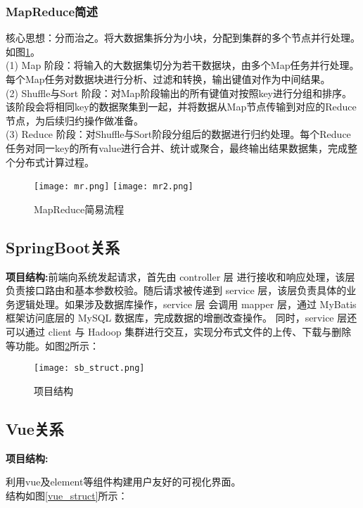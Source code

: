 \documentclass[bachelor]{thesis-uestc}
\begin{document}
\subsubsection{MapReduce简述}
核心思想：分而治之。将大数据集拆分为小块，分配到集群的多个节点并行处理。如图\ref{mr_all}。\\
(1) Map 阶段：将输入的大数据集切分为若干数据块，由多个Map任务并行处理。每个Map任务对数据块进行分析、过滤和转换，输出键值对作为中间结果。\\
(2) Shuffle与Sort 阶段：对Map阶段输出的所有键值对按照key进行分组和排序。该阶段会将相同key的数据聚集到一起，并将数据从Map节点传输到对应的Reduce节点，为后续归约操作做准备。\\
(3) Reduce 阶段：对Shuffle与Sort阶段分组后的数据进行归约处理。每个Reduce任务对同一key的所有value进行合并、统计或聚合，最终输出结果数据集，完成整个分布式计算过程。\\
\begin{figure}[htbp]
    \centering
    \texttt{[image: mr.png]}
    \vspace{1em} %
    \texttt{[image: mr2.png]}
    \caption{MapReduce简易流程\cite{mr}\cite{mr2_heima}}
    \label{mr_all}
\end{figure}

\subsection{SpringBoot关系}
\textbf{项目结构:\cite{springboot_official}}前端向系统发起请求，首先由 controller 层 进行接收和响应处理，该层负责接口路由和基本参数校验\cite{postman_official}。随后请求被传递到 service 层，该层负责具体的业务逻辑处理。如果涉及数据库操作，service 层 会调用 mapper 层，通过 MyBatis 框架访问底层的 MySQL 数据库，完成数据的增删改查操作。
同时，service 层还可以通过 client 与 Hadoop 集群进行交互，实现分布式文件的上传、下载与删除等功能。如图\ref{sb_1}所示：

\begin{figure}[htbp]
    \centering
    \texttt{[image: sb\_struct.png]}
    \caption{项目结构}
    \label{sb_1}
\end{figure}



\subsection{Vue关系}
\textbf{项目结构:}

利用vue\cite{vue_official}及element\cite{element}等组件构建用户友好的可视化界面。\\
结构如图\ref{vue_struct}所示：
\end{document}
